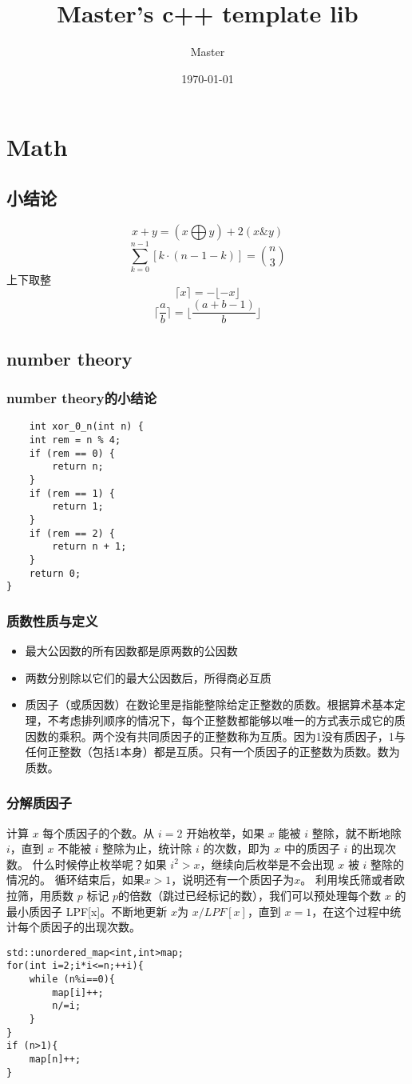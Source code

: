 \documentclass[UTF8]{ctexart}
\title{Master's c++ template lib}
\author{Master}
\date{\today}
\begin{document}
\begin{titlepage}
    \maketitle
\end{titlepage}
\tableofcontents
\section{Math}
\subsection{小结论}
\[
x+y= ( x\bigoplus y ) + 2 ( x \& y )
\]
\[
\sum_{k=0}^{n-1} \left[ k \cdot (n-1-k) \right] = \binom{n}{3}
\]
上下取整
\[
\lceil x \rceil = - \lfloor - x \rfloor
\]
\[
\lceil \frac{a}{b} \rceil =\lfloor \frac{(a+b-1)}{b} \rfloor
\]
\subsection{number theory}
\subsubsection{number theory的小结论}
\begin{lstlisting}
    int xor_0_n(int n) {
    int rem = n % 4;
    if (rem == 0) {
        return n;
    }
    if (rem == 1) {
        return 1;
    }
    if (rem == 2) {
        return n + 1;
    }
    return 0;
}
\end{lstlisting}
\subsubsection{质数性质与定义}
\begin{itemize}
    \item 最大公因数的所有因数都是原两数的公因数
    \item 两数分别除以它们的最大公因数后，所得商必互质
    \item 质因子（或质因数）在数论里是指能整除给定正整数的质数。根据算术基本定理，不考虑排列顺序的情况下，每个正整数都能够以唯一的方式表示成它的质因数的乘积。两个没有共同质因子的正整数称为互质。因为1没有质因子，1与任何正整数（包括1本身）都是互质。只有一个质因子的正整数为质数。数为质数。
\end{itemize}
\subsubsection{分解质因子}
计算 $x$ 每个质因子的个数。从 $i=2$ 开始枚举，如果 $x$ 能被 $i$ 整除，就不断地除 $i$，直到 $x$ 不能被 $i$ 整除为止，统计除 $i$ 的次数，即为 $x$ 中的质因子 $i$ 的出现次数。
什么时候停止枚举呢？如果 $i ^2>x$，继续向后枚举是不会出现 $x$ 被 $i$ 整除的情况的。
循环结束后，如果$ x>1$，说明还有一个质因子为$ x$。
利用埃氏筛或者欧拉筛，用质数 $p$ 标记 $p$的倍数（跳过已经标记的数），我们可以预处理每个数 $x$ 的最小质因子 LPF[x]。不断地更新 $x $为  $x/LPF[x] $，直到 $x=1$，在这个过程中统计每个质因子的出现次数。
\begin{lstlisting}
std::unordered_map<int,int>map;
for(int i=2;i*i<=n;++i){
    while (n%i==0){
        map[i]++;
        n/=i;
    }
}
if (n>1){
    map[n]++;
}
\end{lstlisting}
\end{document}
